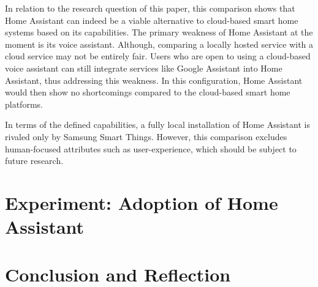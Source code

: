 \newpage

In relation to the research question of this paper, this comparison shows that Home Assistant can indeed be a viable alternative to cloud-based smart home systems based on its capabilities. The primary weakness of Home Assistant at the moment is its voice assistant. Although, comparing a locally hosted service with a cloud service may not be entirely fair. Users who are open to using a cloud-based voice assistant can still integrate services like Google Assistant into Home Assistant, thus addressing this weakness. In this configuration, Home Assistant would then show no shortcomings compared to the cloud-based smart home platforms.

In terms of the defined capabilities, a fully local installation of Home Assistant is rivaled only by Samsung Smart Things. However, this comparison excludes human-focused attributes such as user-experience, which should be subject to future research.


\section{Experiment: Adoption of Home Assistant}


\newpage


\section{Conclusion and Reflection}

